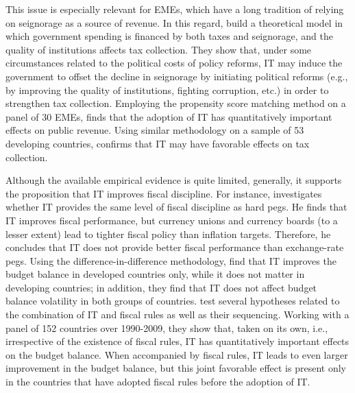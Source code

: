 \documentclass{article}
\begin{document}
This issue is especially relevant for EMEs, which have a long tradition of relying on seignorage as a source of revenue. In this regard, \citet{minea_2021} build a theoretical model in which government spending is financed by both taxes and seignorage, and the quality of institutions affects tax collection. They show that, under some circumstances related to the political costs of policy reforms, IT may induce the government to offset the decline in seignorage by initiating political reforms (e.g., by improving the quality of institutions, fighting corruption, etc.) in order to strengthen tax collection. Employing the propensity score matching method on a panel of 30 EMEs, \citet{lucotte_2012} finds that the adoption of IT has quantitatively important effects on public revenue. Using similar methodology on a sample of 53 developing countries, \citet{minea_2021} confirms that IT may have favorable effects on tax collection.

Although the available empirical evidence is quite limited, generally, it supports the proposition that IT improves fiscal discipline. For instance, \citet{miles_2007} investigates whether IT provides the same level of fiscal discipline as hard pegs. He finds that IT improves fiscal performance, but currency unions and currency boards (to a lesser extent) lead to tighter fiscal policy than inflation targets. Therefore, he concludes that IT does not provide better fiscal performance than exchange-rate pegs. Using the difference-in-difference methodology, \citet{abo-zaid_tuzemen_2012} find that IT improves the budget balance in developed countries only, while it does not matter in developing countries; in addition, they find that IT does not affect budget balance volatility in both groups of countries. \citet{combes_2014} test several hypotheses related to the combination of IT and fiscal rules as well as their sequencing. Working with a panel of 152 countries over 1990-2009, they show that, taken on its own, i.e., irrespective of the existence of fiscal rules, IT has quantitatively important effects on the budget balance. When accompanied by fiscal rules, IT leads to even larger improvement in the budget balance, but this joint favorable effect is present only in the countries that have adopted fiscal rules before the adoption of IT.
\end{document}
